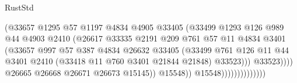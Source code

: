 \begin{lexlean}{RustStd}
\begin{coremodule}
                                            (@33657
                                              @1295
                                              @57
                                              @1197
                                              @4834
                                              @4905
                                              @33405
                                              (@33499
                                                @1293
                                                @126
                                                @989
                                                @44
                                                @4903
                                                @2410
                                                (@26617
                                                  @33335
                                                  @2191
                                                  @209
                                                  @761
                                                  @57
                                                  @11
                                                  @4834
                                                  @3401
                                                  (@33657
                                                    @997
                                                    @57
                                                    @387
                                                    @4834
                                                    @26632
                                                    @33405
                                                    (@33499
                                                      @761
                                                      @126
                                                      @11
                                                      @44
                                                      @3401
                                                      @2410
                                                      (@33418 @11 @760 @3401 @21844 @21848)
                                                      @33523)))
                                                @33523))))
                                        @26665
                                        @26668
                                        @26671
                                        @26673
                                        @15145))
                                    @15548))
                                @15548))))))))))))))

\end{coremodule}
\end{lexlean}
